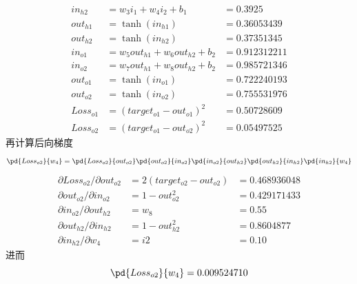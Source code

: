 \documentclass[a4paper, 11pt]{article}
\newcommand{\ipd}[2]{\partial #1/\partial #2}
\begin{document}
\begin{answer}
\begin{itemize}
\[\begin{array}{lll}
        in_{h2} &= w_3 i_1 + w_4 i_2 + b_1 &= 0.3925\\
        out_{h1} &= \tanh(in_{h1}) &=0.36053439\\
        out_{h2} &= \tanh(in_{h2}) &=0.37351345\\
        in_{o1} &= w_5 out_{h1} + w_6 out_{h2} +b_2 &= 0.912312211\\
        in_{o2} &= w_7 out_{h1} + w_8 out_{h2} +b_2 &= 0.985721346\\
        out_{o1} &= \tanh(in_{o1}) &= 0.722240193\\
        out_{o2} &= \tanh(in_{o2}) &= 0.755531976\\
        Loss_{o1} &= (target_{o1}-out_{o1})^2 &=0.50728609\\
        Loss_{o2} &= (target_{o1}-out_{o2})^2 &=0.05497525
    \end{array}\]
    再计算后向梯度
    \[\pd{Loss_{o2}}{w_4}=\pd{Loss_{o2}}{out_{o2}}\pd{out_{o2}}{in_{o2}}\pd{in_{o2}}{out_{h2}}\pd{out_{h2}}{in_{h2}}\pd{in_{h2}}{w_4}\]
    \[\begin{array}{llll}
        \ipd{Loss_{o2}}{out_{o2}}&=2(target_{o2}-out_{o2})&=0.468936048\\
        \ipd{out_{o2}}{in_{o2}}&=1-out_{o2}^2&=0.429171433\\
        \ipd{in_{o2}}{out_{h2}}&=w_8&=0.55\\
        \ipd{out_{h2}}{in_{h2}}&=1-out_{h2}^2&=0.8604877\\
        \ipd{in_{h2}}{w_4}&=i2&=0.10
    \end{array}\]
    进而
    \[\pd{Loss_{o2}}{w_4}=0.009524710\]
\end{itemize}
\end{answer}
\end{document}

